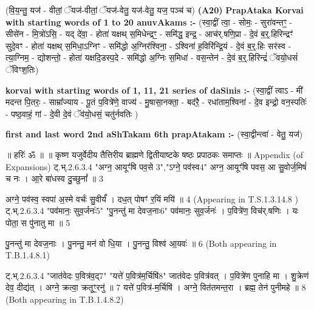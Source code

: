 \documentclass[17pt]{extarticle}
\begin{document}
                                (वि॒य॒न्तु॒ यज॑ - वीतां॒ ॅयज॑-वीतां॒ ॅयज॑-वेतु॒ यज॑-वेतु॒ यज॒ पञ्च॑ च) \textbf{(A20)} \newline \newline
                \textbf{PrapAtaka Korvai with starting  words of 1 to 20 anuvAkams :-} \newline
        (स्वा॒द्वीं त्वा॒ - सोमः॒ - सुरा॑वन्तꣳ॒॒ - सीसे॑न - मि॒त्रो॑ऽसि॒ - यद् दे॑वा॒ - होता॑ यक्षथ् स॒मिधेन्द्रꣳ॒॒ - समि॑द्ध॒ इन्द्र॒ - आच॑र्.षणि॒प्रा - दे॒वं ब॒र्॒.हिरिन्द्रꣳ॑ सुदे॒वꣳ - होता॑ यक्षथ् स॒मिधा॒ऽग्निꣳ - समि॑द्धो अ॒ग्निर॑श्विना॒ - ऽश्विना॑ ह॒विरि॑न्द्रि॒यं - दे॒वं ब॒र्॒.हिः सर॑स्व - त्या॒ग्निम॒ - द्योशन्तो॒ - होता॑ यक्षदि॒डस्प॒दे - समि॑द्धो अ॒ग्निः स॒मिधा॑ - वस॒न्तेन॑ - दे॒वं ब॒र्॒.हिरिन्द्रं॑ ॅवयो॒धसं॑ ॅविꣳश॒तिः) \newline

        \textbf{korvai with starting words of 1, 11, 21 series of daSinis :-} \newline
        (स्वा॒द्वीं त्वाऽ - मी॑ मदन्त पि॒तरः॒ - साम्रा᳚ज्याय - पू॒तं प॒वित्रे॑णे॒ वाज्य॑ - मु॒षासा॒नक्ता॒ - बद॑रै॒ - रधा॑ताम॒श्विना॑ - दे॒व इन्द्रो॒ वन॒स्पतिः॑ - पष्ठ॒वाहं॒ गां - दे॒वी दे॒वं ॅव॑यो॒धसं॒ चतु॑र्नवतिः ) \newline

        \textbf{first and last  word 2nd aShTakam 6th prapAtakam :-} \newline
        (स्वा॒द्वीन्त्वा॑ - वेतु॒ यज॑) \newline 

       

        ॥ हरिः॑ ॐ ॥
॥ कृष्ण यजुर्वेदीय तैत्तिरीय ब्राह्मणे द्वितीयाष्टके षष्ठः प्रपाठकः समाप्तः ॥
Appendix (of Expansions)
ट्.भ्.2.6.3.4 "अग्न॒ आयूꣳ॑षि पव॒से {3}","ऽग्ने॒ पव॑स्व{4}" 
अग्न॒ आयूꣳ॑षि पवस॒ आ सु॒वोर्ज॒मिषं॑ च नः । 
आ॒रे बा॑धस्व दु॒च्छुनां᳚ ॥ {3}

अग्ने॒ पव॑स्व॒ स्वपा॑ अ॒स्मे वर्चः॑ सु॒वीर्यं᳚ । 
दध॒त् पोषꣳ॑ र॒यिं मयि॑ ॥ {4}
(Appearing in T.S.1.3.14.8 )
ट्.भ्.2.6.3.4 "पव॑मानः॒ सुव॒र्जनः॑{5}" "पु॒नन्तु॑ मा देवज॒नाः{6}" 
पव॑मानः॒ सुव॒र्जनः॑ । प॒वित्रे॑ण॒ विच॑र्.षणिः । 
यः पोता॒ स पु॑नातु मा ॥ {5}

पु॒नन्तु॑ मा देवज॒नाः । पु॒नन्तु॒ मन॑ वो धि॒या । 
पु॒नन्तु॒ विश्व॑ आ॒यवः॑ ॥ {6} 
(Both appearing in T.B.1.4.8.1)


ट्.भ्.2.6.3.4 "जात॑वेदः प॒वित्र॑व॒द्{7}" "यत्ते॑ प॒वित्र॑म॒र्चिषि॑{8}"
जात॑वेदः प॒वित्र॑वत् । प॒वित्रे॑ण पुनाहि मा । 
शु॒क्रेण॑ देव॒ दीद्य॑त् । अग्ने॒ क्रत्वा॒ क्रतूꣳ॒॒रनु॑ ॥ {7}
यत्ते॑ प॒वित्र॑-म॒र्चिषि॑ । अग्ने॒ वित॑तमन्त॒रा । 
ब्रह्म॒ तेन॑ पुनीमहे ॥ {8}
(Both appearing in T.B.1.4.8.2)
\end{document}
